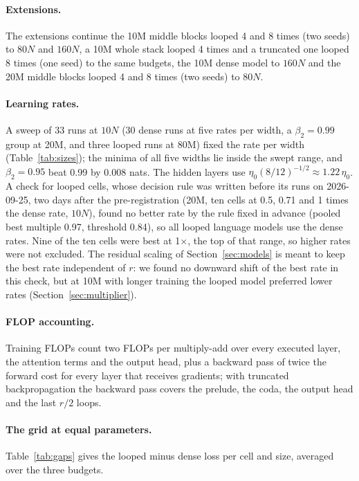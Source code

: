 \paragraph{Extensions.} The extensions continue the 10M middle blocks looped 4 and 8 times (two seeds) to $80N$ and
$160N$, a 10M whole stack looped 4 times and a truncated one looped 8 times (one seed) to the same budgets, the 10M dense
model to $160N$ and the 20M middle blocks looped 4 and 8 times (two seeds) to $80N$.

\paragraph{Learning rates.} A sweep of 33 runs at $10N$ (30 dense runs at five rates per width, a $\beta_2 = 0.99$ group
at 20M, and three looped runs at 80M) fixed the rate per width (Table~\ref{tab:sizes}); the minima of all five widths
lie inside the swept range, and $\beta_2 = 0.95$ beat 0.99 by 0.008 nats. The hidden layers use
$\eta_0 (8/12)^{-1/2} \approx 1.22\,\eta_0$. A check for looped cells, whose decision rule was written before its runs on 2026-09-25, two days after the
pre-registration (20M, ten cells at 0.5, 0.71 and 1
times the dense rate, $10N$), found no better rate by the rule fixed in advance (pooled best multiple 0.97, threshold
0.84), so all looped language models use the dense rates. Nine of the ten cells were best at 1$\times$, the top
of that range, so higher rates were not excluded. The residual scaling of Section~\ref{sec:models} is meant to keep the
best rate independent of $r$: we found no downward shift of the best rate in this check, but at 10M with longer training
the looped model preferred lower rates (Section~\ref{sec:multiplier}).

\paragraph{FLOP accounting.} Training FLOPs count two FLOPs per multiply-add over every executed layer, the attention
terms and the output head, plus a backward pass of twice the forward cost for every layer that receives gradients; with
truncated backpropagation the backward pass covers the prelude, the coda, the output head and the last $r/2$ loops.

\paragraph{The grid at equal parameters.} Table~\ref{tab:gaps} gives the looped minus dense loss per cell and size,
averaged over the three budgets.

